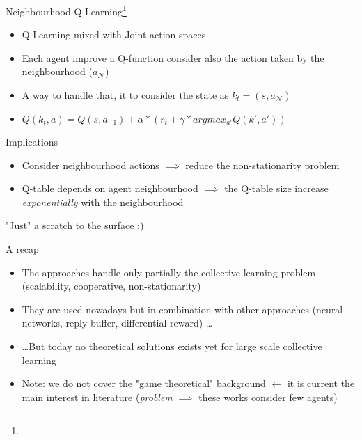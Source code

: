 \documentclass[presentation]{beamer}\mode<presentation>{\usetheme{AMSBolognaFC}}
\begin{document}
\begin{frame}{Neighbourhood Q-Learning\footnote{}}
	\begin{exampleblock}{}
		\begin{itemize}
			\item Q-Learning mixed with Joint action spaces
			\item Each agent improve a Q-function consider also the action taken by the neighbourhood ($a_{\mathcal{N}}$)
			\item A way to handle that, it to consider the state as $k_t = (s, a_{\mathcal{N}})$
			\item $Q(k_t, a) = Q(s, a_{-1}) + \alpha * (r_t + \gamma * argmax_{a'}Q(k', a'))$
		\end{itemize}
	\end{exampleblock}

	\begin{exampleblock}{Implications}
		\begin{itemize}
			\item[{\color{teal}\faThumbsUp}] Consider neighbourhood actions $\implies$ reduce the non-stationarity problem 
			\item[{\color{red}\faThumbsDown}] Q-table depends on agent neighbourhood $\implies$ the Q-table size increase \emph{exponentially} with the neighbourhood
		\end{itemize}
	\end{exampleblock}
\end{frame}
\begin{frame}{"Just" a scratch to the surface :)}
	\begin{exampleblock}{A recap}
		\begin{itemize}
			\item The approaches handle only partially the collective learning problem (scalability, cooperative, non-stationarity)
			\item They are used nowadays but in combination with other approaches (neural networks, reply buffer, differential reward) \dots
			\item \dots But today no theoretical solutions exists yet for large scale collective learning
			\item Note: we do not cover the "game theoretical" background $\leftarrow$ it is current the main interest in literature (\emph{problem} $\implies$ these works consider few agents)
		\end{itemize}
	\end{exampleblock}
\end{frame}
\end{document}
